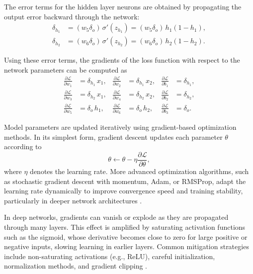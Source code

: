 The error terms for the hidden layer neurons are obtained by propagating the output error backward through the network:
\begin{align}
\delta_{h_1} &= (w_5 \delta_o)\, \sigma'(z_{h_1})
= (w_5 \delta_o)\, h_1(1-h_1), \\
\delta_{h_2} &= (w_6 \delta_o)\, \sigma'(z_{h_2})
= (w_6 \delta_o)\, h_2(1-h_2).
\end{align}

Using these error terms, the gradients of the loss function with respect to the network parameters can be computed as
\begin{align}
\frac{\partial \mathcal{L}}{\partial w_1} &= \delta_{h_1} \, x_1, &
\frac{\partial \mathcal{L}}{\partial w_2} &= \delta_{h_1} \, x_2, &
\frac{\partial \mathcal{L}}{\partial b_1} &= \delta_{h_1}, \\
\frac{\partial \mathcal{L}}{\partial w_3} &= \delta_{h_2} \, x_1, &
\frac{\partial \mathcal{L}}{\partial w_4} &= \delta_{h_2} \, x_2, &
\frac{\partial \mathcal{L}}{\partial b_2} &= \delta_{h_2}, \\
\frac{\partial \mathcal{L}}{\partial w_5} &= \delta_o \, h_1, &
\frac{\partial \mathcal{L}}{\partial w_6} &= \delta_o \, h_2, &
\frac{\partial \mathcal{L}}{\partial b_3} &= \delta_o.
\end{align}

Model parameters are updated iteratively using gradient-based optimization methods. In its simplest form, gradient descent updates each parameter $\theta$ according to
\begin{equation}
\theta \leftarrow \theta - \eta \frac{\partial \mathcal{L}}{\partial \theta},
\end{equation}
where $\eta$ denotes the learning rate. More advanced optimization algorithms, such as stochastic gradient descent with momentum, Adam, or RMSProp, adapt the learning rate dynamically to improve convergence speed and training stability, particularly in deeper network architectures \cite{sun2019optimizationdeeplearningtheory}.

In deep networks, gradients can vanish or explode as they are propagated through many layers. This effect is amplified by saturating activation functions such as the sigmoid, whose derivative becomes close to zero for large positive or negative inputs, slowing learning in earlier layers. Common mitigation strategies include non-saturating activations (e.g., ReLU), careful initialization, normalization methods, and gradient clipping \cite{elharrouss2025taskbasedlossfunctionscomputer}.


